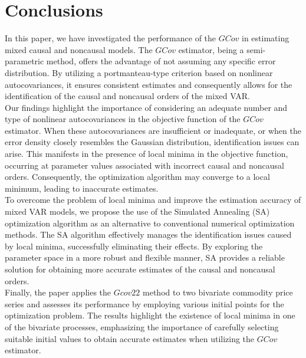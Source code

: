 \documentclass[<1p>]{elsarticle} %
\begin{document}
\section{Conclusions}
In this paper, we have investigated the performance of the $GCov$ in estimating mixed causal and noncausal models. The $GCov$ estimator, being a semi-parametric method, offers the advantage of not assuming any specific error distribution. By utilizing a portmanteau-type criterion based on nonlinear autocovariances, it ensures consistent estimates and consequently allows for the identification of the causal and noncausal orders of the mixed VAR.\\
\indent Our findings highlight the importance of considering an adequate number and type of nonlinear autocovariances in the objective function of the $GCov$ estimator. When these autocovariances are insufficient or inadequate, or when the error density closely resembles the Gaussian distribution, identification issues can arise. This manifests in the presence of local minima in the objective function, occurring at parameter values associated with incorrect causal and noncausal orders. Consequently, the optimization algorithm may converge to a local minimum, leading to inaccurate estimates.\\
\indent To overcome the problem of local minima and improve the estimation accuracy of mixed VAR models, we propose the use of the Simulated Annealing (SA) optimization algorithm as an alternative to conventional numerical optimization methods. The SA algorithm effectively manages the identification issues caused by local minima, successfully eliminating their effects. By exploring the parameter space in a more robust and flexible manner, SA provides a reliable solution for obtaining more accurate estimates of the causal and noncausal orders.\\
\indent Finally, the paper applies the $Gcov22$ method to two bivariate commodity price series and assesses its performance by employing various initial points for the optimization problem. The results highlight the existence of local minima in one of the bivariate processes, emphasizing the importance of carefully selecting suitable initial values to obtain accurate estimates when utilizing the $GCov$ estimator.
\newpage
{}
\raggedright

\end{document}
